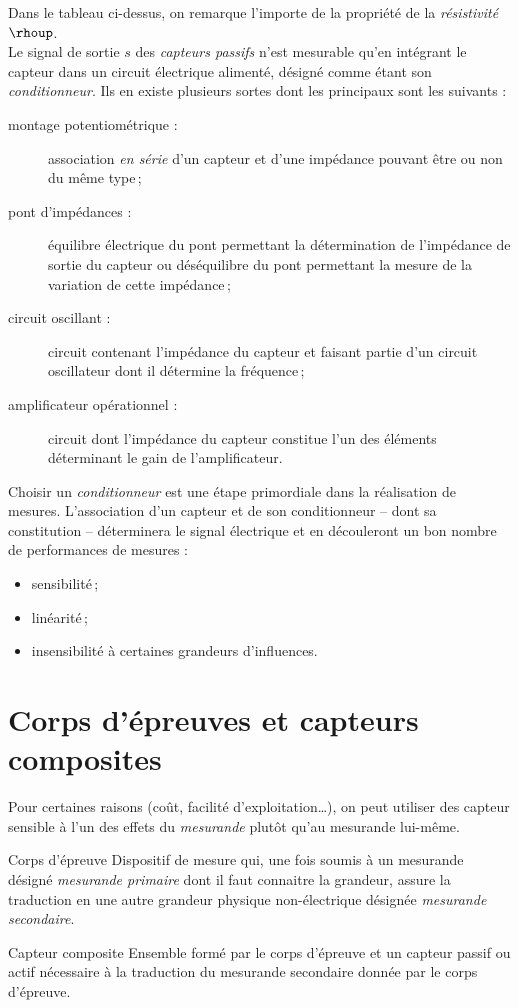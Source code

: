 Dans le tableau ci-dessus, on remarque l'importe de la propriété de la \emph{résistivité} $\rhoup$.\\
Le signal de sortie $s$ des \emph{capteurs passifs} n'est mesurable qu'en intégrant le capteur dans un circuit électrique alimenté, désigné comme étant son \emph{conditionneur}. Ils en existe plusieurs sortes dont les principaux sont les suivants :
\begin{description}
\item [montage potentiométrique :] association \emph{en série} d'un capteur et d'une impédance pouvant être ou non du même type\,;
\item [pont d'impédances :] équilibre électrique du pont permettant la détermination de l'impédance de sortie du capteur ou déséquilibre du pont permettant la mesure de la variation de cette impédance\,;
\item [circuit oscillant :] circuit contenant l'impédance du capteur et faisant partie d'un circuit oscillateur dont il détermine la fréquence\,;
\item [amplificateur opérationnel :] circuit dont l'impédance du capteur constitue l'un des éléments déterminant le gain de l'amplificateur.
\end{description}

Choisir un \emph{conditionneur} est une étape primordiale dans la réalisation de mesures. L'association d'un capteur et de son conditionneur -- dont sa constitution -- déterminera le signal électrique et en découleront un bon nombre de performances de mesures :
\begin{itemize}
\item sensibilité\,;
\item linéarité\,;
\item insensibilité à certaines grandeurs d'influences.
\end{itemize}

\section{Corps d'épreuves et capteurs composites}

Pour certaines raisons (coût, facilité d'exploitation\ldots), on peut utiliser des capteur sensible à l'un des effets du \emph{mesurande} plutôt qu'au mesurande lui-même.

\begin{definition}{Corps d'épreuve}{}
Dispositif de mesure qui, une fois soumis à un mesurande désigné \emph{mesurande primaire} dont il faut connaitre la grandeur, assure la traduction en une autre grandeur physique non-électrique désignée \emph{mesurande secondaire}.
\end{definition}
\begin{definition}{Capteur composite}{}
Ensemble formé par le corps d'épreuve et un capteur passif ou actif nécessaire à la traduction du mesurande secondaire donnée par le corps d'épreuve.
\end{definition}

